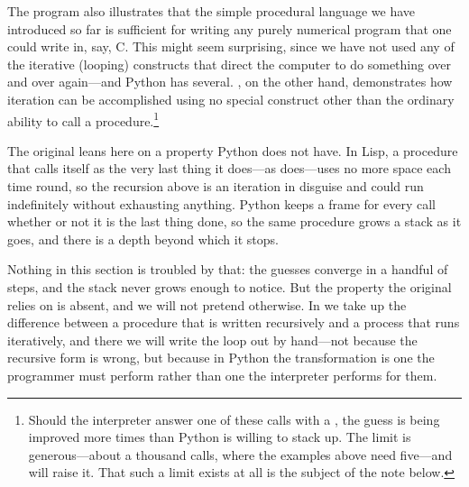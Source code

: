 \noindent
The  program also illustrates that the simple procedural language we
have introduced so far is sufficient for writing any purely numerical program
that one could write in, say, C.  This might seem surprising, since we have not
used any of the iterative (looping) constructs that direct the computer to do
something over and over again---and Python has several.  , on
the other hand, demonstrates how iteration can be accomplished using no special
construct other than the ordinary ability to call a procedure.\footnote{Should
the interpreter answer one of these calls with a , the
guess is being improved more times than Python is willing to stack up.  The
limit is generous---about a thousand calls, where the examples above need
five---and  will raise it.  That such a limit
exists at all is the subject of the note below.}

\begin{departure}
The original leans here on a property Python does not have.  In Lisp, a
procedure that calls itself as the very last thing it does---as
 does---uses no more space each time round, so the recursion
above is an iteration in disguise and could run indefinitely without exhausting
anything.  Python keeps a frame for every call whether or not it is the last
thing done, so the same procedure grows a stack as it goes, and there is a
depth beyond which it stops.

Nothing in this section is troubled by that: the guesses converge in a handful
of steps, and the stack never grows enough to notice.  But the property the
original relies on is absent, and we will not pretend otherwise.  In
 we take up the difference between a procedure that is
written recursively and a process that runs iteratively, and there we will
write the loop out by hand---not because the recursive form is wrong, but
because in Python the transformation is one the programmer must perform rather
than one the interpreter performs for them.
\end{departure}

